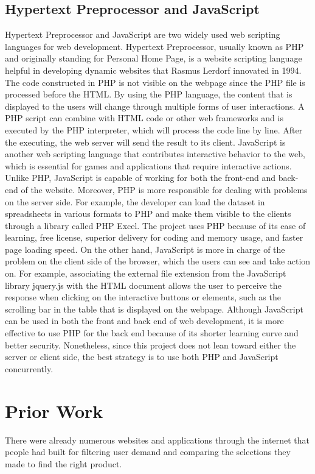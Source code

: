 \documentclass[10pt,twocolumn]{article}
\begin{document}
\subsection{Hypertext Preprocessor and JavaScript}
Hypertext Preprocessor and JavaScript are two widely used web scripting languages for web development. Hypertext Preprocessor, usually known as PHP and originally standing for Personal Home Page, is a website scripting language helpful in developing dynamic websites that Rasmus Lerdorf innovated in 1994\cite{StudySection2019}. The code constructed in PHP is not visible on the webpage since the PHP file is processed before the HTML. By using the PHP language, the content that is displayed to the users will change through multiple forms of user interactions. A PHP script can combine with HTML code or other web frameworks and is executed by the PHP interpreter, which will process the code line by line. After the executing, the web server will send the result to its client. 
JavaScript is another web scripting language that contributes interactive behavior to the web, which is essential for games and applications that require interactive actions. Unlike PHP, JavaScript is capable of working for both the front-end and back-end of the website.
\newline
\indent
Moreover, PHP is more responsible for dealing with problems on the server side. For example, the developer can load the dataset in spreadsheets in various formats to PHP and make them visible to the clients through a library called PHP Excel. The project uses PHP because of its ease of learning, free license, superior delivery for coding and memory usage, and faster page loading speed. On the other hand, JavaScript is more in charge of the problem on the client side of the browser, which the users can see and take action on. For example, associating the external file extension from the JavaScript library jquery.js with the HTML document allows the user to perceive the response when clicking on the interactive buttons or elements, such as the scrolling bar in the table that is displayed on the webpage. 
\newline
\indent
Although JavaScript can be used in both the front and back end of web development, it is more effective to use PHP for the back end because of its shorter learning curve and better security. Nonetheless, since this project does not lean toward either the server or client side, the best strategy is to use both PHP and JavaScript concurrently. 

\section{Prior Work}
There were already numerous websites and applications through the internet that people had built for filtering user demand and comparing the selections they made to find the right product. 
\end{document}
